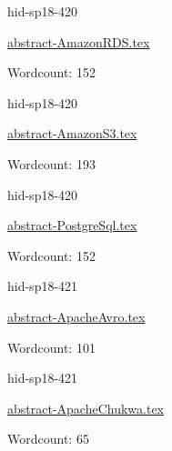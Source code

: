 

\begin{IU}

hid-sp18-420

\href{https://github.com/cloudmesh-community/hid-sp18-420/blob/master//technology/abstract-AmazonRDS.tex}{abstract-AmazonRDS.tex}

 

Wordcount: 152

\end{IU}



\begin{IU}

hid-sp18-420

\href{https://github.com/cloudmesh-community/hid-sp18-420/blob/master//technology/abstract-AmazonS3.tex}{abstract-AmazonS3.tex}

 

Wordcount: 193

\end{IU}



\begin{IU}

hid-sp18-420

\href{https://github.com/cloudmesh-community/hid-sp18-420/blob/master//technology/abstract-PostgreSql.tex}{abstract-PostgreSql.tex}

 

Wordcount: 152

\end{IU}



\begin{IU}

hid-sp18-421

\href{https://github.com/cloudmesh-community/hid-sp18-421/blob/master//technology/abstract-ApacheAvro.tex}{abstract-ApacheAvro.tex}

 

Wordcount: 101

\end{IU}



\begin{IU}

hid-sp18-421

\href{https://github.com/cloudmesh-community/hid-sp18-421/blob/master//technology/abstract-ApacheChukwa.tex}{abstract-ApacheChukwa.tex}

 

Wordcount: 65

\end{IU}

